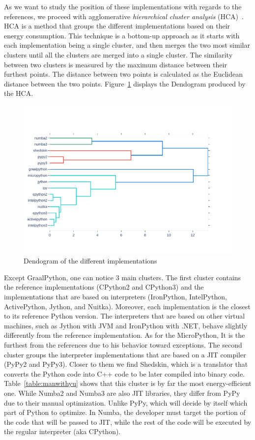 As we want to study the position of these implementations with regards to the references, we proceed with agglomerative \emph{hierarchical cluster analysis} (HCA)~\cite{johnson1967hierarchical}.
HCA is a method that groups the different implementations based on their energy consumption.
This technique is a bottom-up approach as it starts with each implementation being a single cluster, and then merges the two most similar clusters until all the clusters are merged into a single cluster.
The similarity between two clusters is measured by the maximum distance between their furthest points.
The distance between two points is calculated as the Euclidean distance between the two points.
Figure~\ref{fig:dendogram} displays the Dendogram produced by the HCA.

\begin{figure}
      \centering
      \includegraphics[width=\linewidth]{imgs/dendogram_interpreters}
      \caption{Dendogram of the different implementations}
      \label{fig:dendogram}
\end{figure}

Except GraalPython, one can notice 3 main clusters.
The first cluster contains the reference implementations (CPython2 and CPython3) and the implementations that are based on interpreters (IronPython, IntelPython, ActivePython, Jython, and Nuitka).
Moreover, each implementation is the closest to its reference Python version.
The interpreters that are based on other virtual machines, such as Jython with JVM and IronPython with .NET, behave slightly differently from the reference implementation.
As for the MicroPython, It is the furthest from the references due to his behavior toward exceptions.
The second cluster groups the interpreter implementations that are based on a JIT compiler (PyPy2 and PyPy3).
Closer to them we find Shedskin, which is a translator that converts the Python code into C++ code to be later compiled into binary code.
Table~\ref{table:manwithyu} shows that this cluster is by far the most energy-efficient one.
While Numba2 and Numba3 are also JIT libraries, they differ from PyPy due to their manual optimization.
Unlike PyPy, which will decide by itself which part of Python to optimize.
In Numba, the developer must target the portion of the code that will be passed to JIT, while the rest of the code will be executed by the regular interpreter (aka CPython).
